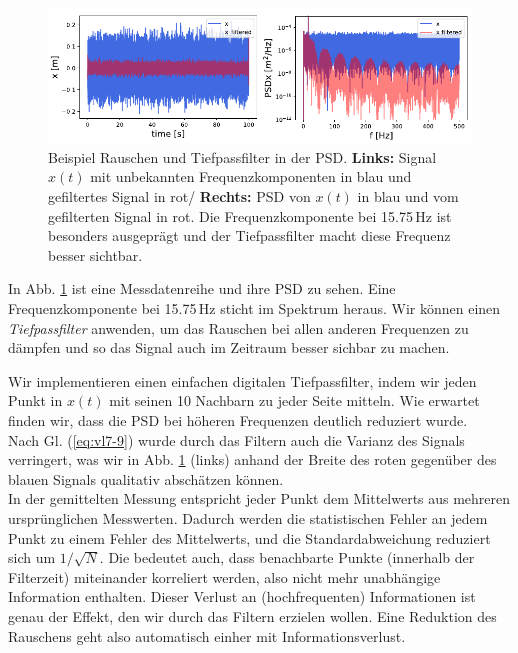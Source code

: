 \begin{figure}[htbp]
    \centering
        \includegraphics[width=\textwidth]{Figures/psd_fig3.pdf}
        \caption{Beispiel Rauschen und Tiefpassfilter in der PSD. \textbf{Links:} Signal $x(t)$ mit unbekannten Frequenzkomponenten in blau und gefiltertes Signal in rot/ \textbf{Rechts:} PSD von $x(t)$ in blau und vom gefilterten Signal in rot. Die Frequenzkomponente bei 15.75\,Hz ist besonders ausgeprägt und der Tiefpassfilter macht diese Frequenz besser sichtbar.}
        \label{fig:parseval}
\end{figure}

In Abb. \ref{fig:parseval} ist eine Messdatenreihe und ihre PSD zu sehen. Eine Frequenzkomponente bei 15.75\,Hz sticht im Spektrum heraus. Wir können einen \textit{Tiefpassfilter} anwenden, um das Rauschen bei allen anderen Frequenzen zu dämpfen und so das Signal auch im Zeitraum besser sichbar zu machen. 

Wir implementieren einen einfachen digitalen Tiefpassfilter, indem wir jeden Punkt in $x(t)$ mit seinen 10 Nachbarn zu jeder Seite mitteln. Wie erwartet finden wir, dass die PSD bei höheren Frequenzen deutlich reduziert wurde.\\ 

Nach Gl. (\ref{eq:vl7-9}) wurde durch das Filtern auch die Varianz des Signals verringert, was wir in Abb. \ref{fig:parseval} (links) anhand der Breite des roten gegenüber des blauen Signals qualitativ abschätzen können. \\

In der gemittelten Messung entspricht jeder Punkt dem Mittelwerts aus mehreren ursprünglichen Messwerten. Dadurch werden die statistischen Fehler an jedem Punkt zu einem Fehler des Mittelwerts, und die Standardabweichung reduziert sich um $1/\sqrt{N}$. Die bedeutet auch, dass benachbarte Punkte (innerhalb der Filterzeit) miteinander korreliert werden, also nicht mehr unabhängige Information enthalten. Dieser Verlust an (hochfrequenten) Informationen ist genau der Effekt, den wir durch das Filtern erzielen wollen. Eine Reduktion des Rauschens geht also automatisch einher mit Informationsverlust.

